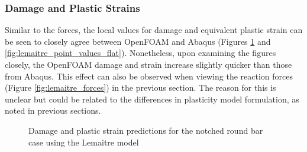 \documentclass[sn-mathphys,Numbered]{sn-jnl}%
\begin{document}
\subsubsection{Damage and Plastic Strains}
Similar to the forces, the local values for damage and equivalent plastic strain can be seen to closely agree between OpenFOAM and Abaqus (Figures \ref{fig:lemaitre_point_values_axi} and \ref{fig:lemaitre_point_values_flat}).
Nonetheless, upon examining the figures closely, the OpenFOAM damage and strain increase slightly quicker than those from Abaqus.
This effect can also be observed when viewing the reaction forces (Figure \ref{fig:lemaitre_forces}) in the previous section.
The reason for this is unclear but could be related to the differences in plasticity model formulation, as noted in previous sections.
\begin{figure}[htbp]
	\centering
	\caption{Damage and plastic strain predictions for the notched round bar case using the Lemaitre model}
	\label{fig:lemaitre_point_values_axi}
\end{figure}
\end{document}
